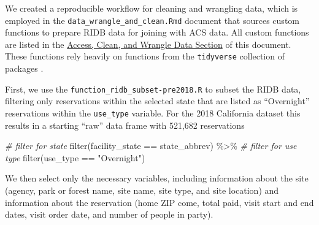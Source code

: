 \documentclass[
  11 pt,
  openany]{book}
\newenvironment{Shaded}{\begin{snugshade}}{\end{snugshade}}
\newcommand{\CommentTok}[1]{\textcolor[rgb]{0.56,0.35,0.01}{\textit{#1}}}
\newcommand{\FunctionTok}[1]{\textcolor[rgb]{0.00,0.00,0.00}{#1}}
\newcommand{\NormalTok}[1]{#1}
\newcommand{\SpecialCharTok}[1]{\textcolor[rgb]{0.00,0.00,0.00}{#1}}
\newcommand{\StringTok}[1]{\textcolor[rgb]{0.31,0.60,0.02}{#1}}
\begin{document}
We created a reproducible workflow for cleaning and wrangling data, which is employed in the \texttt{data\_wrangle\_and\_clean.Rmd} document that sources custom functions to prepare RIDB data for joining with ACS data. All custom functions are listed in the \protect\hyperlink{access-clean-and-wrangle-data}{Access, Clean, and Wrangle Data Section} of this document. These functions rely heavily on functions from the \texttt{tidyverse} collection of packages \citep{R-tidyverse}.

First, we use the \texttt{function\_ridb\_subset-pre2018.R} to subset the RIDB data, filtering only reservations within the selected state that are listed as ``Overnight'' reservations within the \texttt{use\_type} variable. For the 2018 California dataset this results in a starting ``raw'' data frame with 521,682 reservations

\begin{Shaded}
\begin{Highlighting}[]
\CommentTok{\# filter for state}
\FunctionTok{filter}\NormalTok{(facility\_state }\SpecialCharTok{==}\NormalTok{ state\_abbrev) }\SpecialCharTok{\%\textgreater{}\%}
  \CommentTok{\# filter for use type}
  \FunctionTok{filter}\NormalTok{(use\_type }\SpecialCharTok{==} \StringTok{"Overnight"}\NormalTok{)}
\end{Highlighting}
\end{Shaded}

We then select only the necessary variables, including information about the site (agency, park or forest name, site name, site type, and site location) and information about the reservation (home ZIP come, total paid, visit start and end dates, visit order date, and number of people in party).
\end{document}
